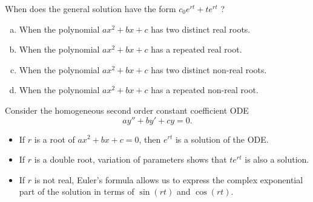 \begin{applicationActivities}
\begin{activity}{5}
When does the general solution have the form \(c_0 e^{rt}+te^{rt}\) ?
\begin{enumerate}[(a)]
\item When the polynomial \(ax^2+bx+c\) has two distinct real roots.
\item When the polynomial \(ax^2+bx+c\) has a repeated real root.
\item When the polynomial \(ax^2+bx+c\) has two distinct non-real roots.
\item When the polynomial \(ax^2+bx+c\) has a repeated non-real root.
\end{enumerate}
\end{activity}


\begin{observation}
Consider the homogeneous second order constant coefficient ODE \[ay''+by'+cy=0.\]
\vfill
\begin{itemize}
\item If \(r\) is a root of \(ax^2+bx+c=0\), then \(e^{rt}\) is a solution of the ODE.
\item If \(r\) is a double root, variation of parameters shows that \(te^{rt}\) is also a solution.
\item If \(r\) is not real, Euler's formula allows us to express the complex exponential part of the solution in terms of \(\sin(rt)\) and \(\cos(rt)\).
\end{itemize}
\end{observation}



\end{applicationActivities}
